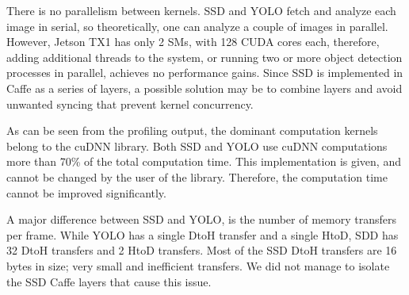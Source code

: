There is no parallelism between kernels. SSD and YOLO fetch and analyze each image in serial, so theoretically, one can analyze a couple of images in parallel. However, Jetson TX1 has only 2 SMs, with 128 CUDA cores each, therefore, adding additional threads to the system, or running two or more object detection processes in parallel, achieves no performance gains. Since SSD is implemented in Caffe as a series of layers, a possible solution may be to combine layers and avoid unwanted syncing that prevent kernel concurrency.

As can be seen from the profiling output, the dominant computation kernels belong to the cuDNN library. Both SSD and YOLO use cuDNN computations more than 70\% of the total computation time. This implementation is given, and cannot be changed by the user of the library. Therefore, the computation time cannot be improved significantly.

A major difference between SSD and YOLO, is the number of memory transfers per frame. While YOLO has a single DtoH transfer and a single HtoD, SDD has 32 DtoH transfers and 2 HtoD transfers. Most of the SSD DtoH transfers are 16 bytes in size; very small and inefficient transfers. We did not manage to isolate the SSD Caffe layers that cause this issue.  

